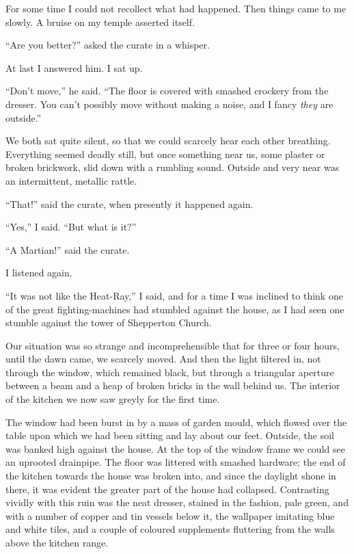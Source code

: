 For some time I could not recollect what had happened. Then things
came to me slowly. A bruise on my temple asserted itself.

``Are you better?'' asked the curate in a whisper.

At last I answered him. I sat up.

``Don't move,'' he said. ``The floor is covered with smashed crockery
from the dresser. You can't possibly move without making a noise,
and I fancy \emph{they} are outside.''

We both sat quite silent, so that we could scarcely hear each other
breathing. Everything seemed deadly still, but once something near
us, some plaster or broken brickwork, slid down with a rumbling
sound. Outside and very near was an intermittent, metallic rattle.

``That!'' said the curate, when presently it happened again.

``Yes,'' I said. ``But what is it?''

``A Martian!'' said the curate.

I listened again.

``It was not like the Heat-Ray,'' I said, and for a time I was
inclined to think one of the great fighting-machines had stumbled
against the house, as I had seen one stumble against the tower of
Shepperton Church.

Our situation was so strange and incomprehensible that for three or
four hours, until the dawn came, we scarcely moved. And then the
light filtered in, not through the window, which remained black,
but through a triangular aperture between a beam and a heap of
broken bricks in the wall behind us. The interior of the kitchen we
now saw greyly for the first time.

The window had been burst in by a mass of garden mould, which
flowed over the table upon which we had been sitting and lay about
our feet. Outside, the soil was banked high against the house. At
the top of the window frame we could see an uprooted drainpipe. The
floor was littered with smashed hardware; the end of the kitchen
towards the house was broken into, and since the daylight shone in
there, it was evident the greater part of the house had collapsed.
Contrasting vividly with this ruin was the neat dresser, stained in
the fashion, pale green, and with a number of copper and tin
vessels below it, the wallpaper imitating blue and white tiles, and
a couple of coloured supplements fluttering from the walls above
the kitchen range.

